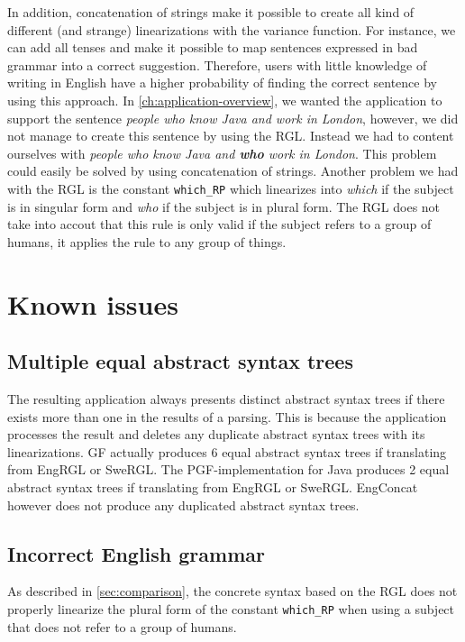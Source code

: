 In addition, concatenation of strings make it possible to create all kind of different (and strange) linearizations with the variance function. For instance, we can add all tenses and make it possible to map sentences expressed in bad grammar into a correct suggestion. Therefore, users with little knowledge of writing in English have a higher probability of finding the correct sentence by using this approach.
\newline
\newline
In \autoref{ch:application-overview}, we wanted the application to support the sentence \emph{people who know Java and work in London}, however, we did not manage to create this sentence by using the RGL. Instead we had to content ourselves with \emph{people who know Java and \textbf{who} work in London}. This problem could easily be solved by using concatenation of strings.
\newline
\newline
Another problem we had with the RGL is the constant \texttt{which\_RP} which linearizes into \emph{which} if the subject is in singular form and \emph{who} if the subject is in plural form. The RGL does not take into accout that this rule is only valid if the subject refers to a group of humans, it applies the rule to any group of things.

\section{Known issues}\label{sec:known-issues}

\subsection*{Multiple equal abstract syntax trees}
The resulting application always presents distinct abstract syntax trees if there exists more than one in the results of a parsing. This is because the application processes the result and deletes any duplicate abstract syntax trees with its linearizations. GF actually produces 6 equal abstract syntax trees if translating from EngRGL or SweRGL. The PGF-implementation for Java produces 2 equal abstract syntax trees if translating from EngRGL or SweRGL. EngConcat however does not produce any duplicated abstract syntax trees.

\subsection*{Incorrect English grammar}
As described in \autoref{sec:comparison}, the concrete syntax based on the RGL does not properly linearize the plural form of the constant \texttt{which\_RP} when using a subject that does not refer to a group of humans.

